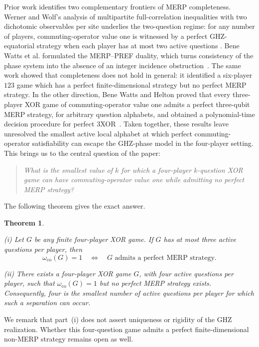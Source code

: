 \documentclass[11pt]{article}
\newtheorem{theorem}{Theorem}[section]
\theoremstyle{definition}
\theoremstyle{remark}
\newcommand{\co}{\mathrm{co}}
\numberwithin{equation}{section}
\begin{document}
Prior work identifies two complementary frontiers of MERP completeness.
Werner and Wolf's analysis of multipartite full-correlation inequalities with
two dichotomic observables per site underlies the two-question regime: for any
number of players, commuting-operator value one is witnessed by a perfect
GHZ-equatorial strategy when each player has at most two active questions
\cite{WernerWolf2001,WattsHelton2023}.  Bene Watts et al. formulated the MERP--PREF duality, which turns consistency of the phase system into the absence of an integer incidence obstruction~\cite{WattsHarrowKanwarNatarajan2019}.  The same work showed that completeness
does not hold in general: it identified a six-player \(123\) game which has a perfect finite-dimensional strategy but no perfect MERP strategy.  In the other direction, Bene Watts and Helton proved that every three-player XOR game of commuting-operator value one admits a perfect three-qubit MERP strategy, for
arbitrary question alphabets, and obtained a polynomial-time decision
procedure for perfect \(3\)XOR~\cite{WattsHelton2023}.   Taken together, these results leave unresolved the
smallest active local alphabet at which perfect commuting-operator
satisfiability can escape the GHZ-phase model in the four-player setting.
This brings us to the central question of the paper:
\begin{quote}
\emph{What is the smallest value of \(k\) for which a four-player \(k\)-question XOR game
can have commuting-operator value one while admitting no perfect MERP
strategy?}
\end{quote}
The following theorem gives the exact answer.

\begin{theorem}\label{thm:main}

\emph{(i)} Let \(G\) be any finite four-player XOR game. If \(G\) has at most three active questions per player, then
\begin{equation}\label{eq:main-result}
  \omega_{\co}(G)=1
  \quad\Longleftrightarrow\quad
  G\text{ admits a perfect MERP strategy}.
\end{equation}

\emph{(ii)} There exists a four-player XOR game \(G\), with four active
questions per player, such that \(\omega_{\co}(G)=1\) but no perfect MERP
strategy exists.  Consequently, four is the smallest number of active
questions per player for which such a separation can occur.
\end{theorem}

We remark that part~(i) does not assert uniqueness or rigidity of the GHZ realization.
Whether this four-question game admits a perfect
finite-dimensional non-MERP strategy remains open as well.
\end{document}
